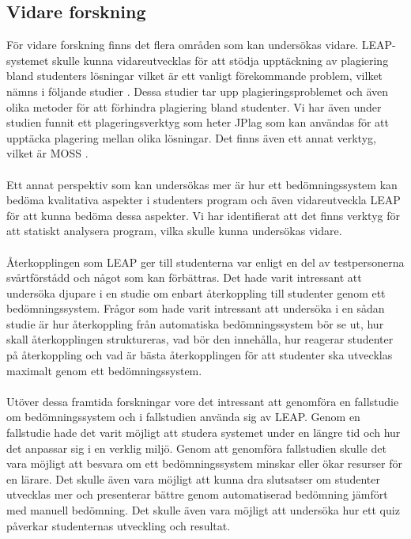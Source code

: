\documentclass[a4paper,11pt]{article}
\begin{document}
{\subsection{Vidare forskning}


För vidare forskning finns det flera områden som kan undersökas vidare. LEAP-systemet skulle kunna vidareutvecklas för att stödja upptäckning av plagiering bland studenters lösningar vilket är ett vanligt förekommande problem, vilket nämns i följande studier \cite{joy_plagiarism_1999} \cite{kaya_plagiarism_2015} \cite{sufian_plagiarism_2010} \cite{rosales_plagiarism_2008} \cite{roboprof_4} \cite{ihantola}. Dessa studier tar upp plagieringsproblemet och även olika metoder för att förhindra plagiering bland studenter. Vi har även under studien funnit ett plageringsverktyg som heter JPlag \cite{jplag} som kan användas för att upptäcka plagering mellan olika lösningar. Det finns även ett annat verktyg, vilket är MOSS \cite{moss}.
\\
\\
Ett annat perspektiv som kan undersökas mer är hur ett bedömningssystem kan bedöma kvalitativa aspekter i studenters program och även vidareutveckla LEAP för att kunna bedöma dessa aspekter. Vi har identifierat att det finns verktyg för att statiskt analysera program, vilka skulle kunna undersökas vidare.
\\
\\
Återkopplingen som LEAP ger till studenterna var enligt en del av testpersonerna svårtförstådd och något som kan förbättras. Det hade varit intressant att undersöka djupare i en studie om enbart återkoppling till studenter genom ett bedömningssystem. Frågor som hade varit intressant att undersöka i en sådan studie är hur återkoppling från automatiska bedömningssystem bör se ut, hur skall återkopplingen struktureras, vad bör den innehålla, hur reagerar studenter på återkoppling och vad är bästa återkopplingen för att studenter ska utvecklas maximalt genom ett bedömningssystem.
\\
\\
Utöver dessa framtida forskningar vore det intressant att genomföra en fallstudie om bedömningssystem och i fallstudien använda sig av LEAP. Genom en fallstudie hade det varit möjligt att studera systemet under en längre tid och hur det anpassar sig i en verklig miljö. Genom att genomföra fallstudien skulle det vara möjligt att besvara om ett bedömningssystem minskar eller ökar resurser för en lärare. Det skulle även vara möjligt att kunna dra slutsatser om studenter utvecklas mer och presenterar bättre genom automatiserad bedömning jämfört med manuell bedömning. Det skulle även vara möjligt att undersöka hur ett quiz påverkar studenternas utveckling och resultat.



}
\end{document}
